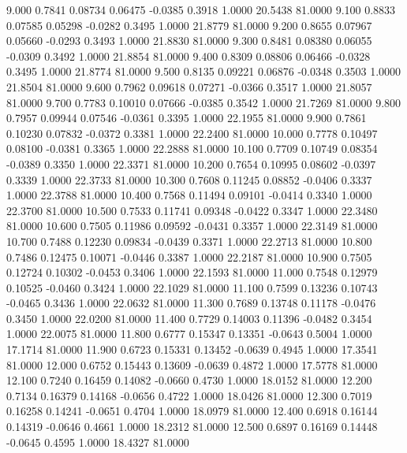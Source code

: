    9.000   0.7841   0.08734   0.06475  -0.0385   0.3918   1.0000  20.5438  81.0000
   9.100   0.8833   0.07585   0.05298  -0.0282   0.3495   1.0000  21.8779  81.0000
   9.200   0.8655   0.07967   0.05660  -0.0293   0.3493   1.0000  21.8830  81.0000
   9.300   0.8481   0.08380   0.06055  -0.0309   0.3492   1.0000  21.8854  81.0000
   9.400   0.8309   0.08806   0.06466  -0.0328   0.3495   1.0000  21.8774  81.0000
   9.500   0.8135   0.09221   0.06876  -0.0348   0.3503   1.0000  21.8504  81.0000
   9.600   0.7962   0.09618   0.07271  -0.0366   0.3517   1.0000  21.8057  81.0000
   9.700   0.7783   0.10010   0.07666  -0.0385   0.3542   1.0000  21.7269  81.0000
   9.800   0.7957   0.09944   0.07546  -0.0361   0.3395   1.0000  22.1955  81.0000
   9.900   0.7861   0.10230   0.07832  -0.0372   0.3381   1.0000  22.2400  81.0000
  10.000   0.7778   0.10497   0.08100  -0.0381   0.3365   1.0000  22.2888  81.0000
  10.100   0.7709   0.10749   0.08354  -0.0389   0.3350   1.0000  22.3371  81.0000
  10.200   0.7654   0.10995   0.08602  -0.0397   0.3339   1.0000  22.3733  81.0000
  10.300   0.7608   0.11245   0.08852  -0.0406   0.3337   1.0000  22.3788  81.0000
  10.400   0.7568   0.11494   0.09101  -0.0414   0.3340   1.0000  22.3700  81.0000
  10.500   0.7533   0.11741   0.09348  -0.0422   0.3347   1.0000  22.3480  81.0000
  10.600   0.7505   0.11986   0.09592  -0.0431   0.3357   1.0000  22.3149  81.0000
  10.700   0.7488   0.12230   0.09834  -0.0439   0.3371   1.0000  22.2713  81.0000
  10.800   0.7486   0.12475   0.10071  -0.0446   0.3387   1.0000  22.2187  81.0000
  10.900   0.7505   0.12724   0.10302  -0.0453   0.3406   1.0000  22.1593  81.0000
  11.000   0.7548   0.12979   0.10525  -0.0460   0.3424   1.0000  22.1029  81.0000
  11.100   0.7599   0.13236   0.10743  -0.0465   0.3436   1.0000  22.0632  81.0000
  11.300   0.7689   0.13748   0.11178  -0.0476   0.3450   1.0000  22.0200  81.0000
  11.400   0.7729   0.14003   0.11396  -0.0482   0.3454   1.0000  22.0075  81.0000
  11.800   0.6777   0.15347   0.13351  -0.0643   0.5004   1.0000  17.1714  81.0000
  11.900   0.6723   0.15331   0.13452  -0.0639   0.4945   1.0000  17.3541  81.0000
  12.000   0.6752   0.15443   0.13609  -0.0639   0.4872   1.0000  17.5778  81.0000
  12.100   0.7240   0.16459   0.14082  -0.0660   0.4730   1.0000  18.0152  81.0000
  12.200   0.7134   0.16379   0.14168  -0.0656   0.4722   1.0000  18.0426  81.0000
  12.300   0.7019   0.16258   0.14241  -0.0651   0.4704   1.0000  18.0979  81.0000
  12.400   0.6918   0.16144   0.14319  -0.0646   0.4661   1.0000  18.2312  81.0000
  12.500   0.6897   0.16169   0.14448  -0.0645   0.4595   1.0000  18.4327  81.0000
